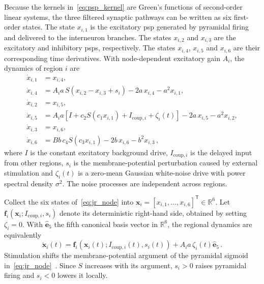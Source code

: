 Because the kernels in~\eqref{eq:psp_kernel} are Green's functions of second-order linear systems, the three filtered synaptic pathways can be written as six first-order states.
The state $x_{i,1}$ is the excitatory \ac{psp} generated by pyramidal firing and delivered to the interneuron branches.
The states $x_{i,2}$ and $x_{i,3}$ are the excitatory and inhibitory \acp{psp}, respectively.
The states $x_{i,4}$, $x_{i,5}$ and $x_{i,6}$ are their corresponding time derivatives.
With node-dependent excitatory gain $A_i$, the dynamics of region $i$ are
%
\begin{align}
    \dot{x}_{i,1} &= x_{i,4}, \nonumber \\
    \dot{x}_{i,4} &= A_i a\,S\!\left(x_{i,2}-x_{i,3}+s_i\right)-2a\,x_{i,4}-a^2x_{i,1}, \nonumber \\
    \dot{x}_{i,2} &= x_{i,5}, \nonumber \\
    \dot{x}_{i,5} &= A_i a\left[I+c_2S\!\left(c_1x_{i,1}\right)+I_{\mathrm{coup},i}+\zeta_i(t)\right]
                     -2a\,x_{i,5}-a^2x_{i,2}, \label{eq:jr_node} \\
    \dot{x}_{i,3} &= x_{i,6}, \nonumber \\
    \dot{x}_{i,6} &= Bb\,c_4S\!\left(c_3x_{i,1}\right)-2b\,x_{i,6}-b^2x_{i,3}\,, \nonumber
\end{align}
%
where $I$ is the constant excitatory background drive, $I_{\mathrm{coup},i}$ is the delayed input from other regions, $s_i$ is the membrane-potential perturbation caused by external stimulation and $\zeta_i(t)$ is a zero-mean Gaussian white-noise drive with power spectral density $\sigma^2$.
The noise processes are independent across regions.

Collect the six states of~\eqref{eq:jr_node} into \mbox{$\mathbf{x}_i={\left[x_{i,1},\ldots,x_{i,6}\right]}^{\mathsf T}\in\mathbb{R}^{6}$}.
Let $\mathbf{f}_i(\mathbf{x}_i;I_{\mathrm{coup},i},s_i)$ denote its deterministic right-hand side, obtained by setting $\zeta_i=0$.
With $\hat{\mathbf{e}}_5$ the fifth canonical basis vector in $\mathbb{R}^6$, the regional dynamics are equivalently
%
\begin{equation}
    \dot{\mathbf{x}}_i(t)
    =\mathbf{f}_i\!\left(\mathbf{x}_i(t);I_{\mathrm{coup},i}(t),s_i(t)\right)
    +A_i a\,\zeta_i(t)\hat{\mathbf{e}}_5\,.
    \label{eq:network_node}
\end{equation}
%
Stimulation shifts the membrane-potential argument of the pyramidal sigmoid in~\eqref{eq:jr_node}~\cite{Kunze2016,Merlet2013,Yu2024}.
Since $S$ increases with its argument, $s_i>0$ raises pyramidal firing and $s_i<0$ lowers it locally.

